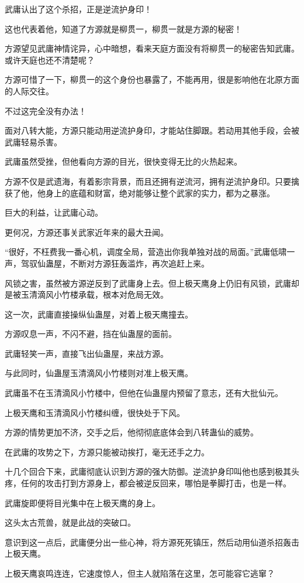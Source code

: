 \begin{this_body}
武庸认出了这个杀招，正是逆流护身印！

这也代表着他，知道了方源就是柳贯一，柳贯一就是方源的秘密！

方源望见武庸神情诧异，心中暗想，看来天庭方面没有将柳贯一的秘密告知武庸。或许天庭也还不清楚呢？

方源可惜了一下，柳贯一的这个身份也暴露了，不能再用，很是影响他在北原方面的人际交往。

不过这完全没有办法！

面对八转大能，方源只能动用逆流护身印，才能站住脚跟。若动用其他手段，会被武庸轻易杀害。

武庸虽然受挫，但他看向方源的目光，很快变得无比的火热起来。

方源不仅是武遗海，有着影宗背景，而且还拥有逆流河，拥有逆流护身印。只要擒获了他，他身上的底蕴和财富，绝对能够让整个武家的实力，都为之暴涨。

巨大的利益，让武庸心动。

更何况，方源还事关武家近年来的最大丑闻。

“很好，不枉费我一番心机，调度全局，营造出你我单独对战的局面。”武庸低啸一声，驾驭仙蛊屋，不断对方源狂轰滥炸，再次追赶上来。

风锁之害，虽然被方源逆反到了武庸身上去。但上极天鹰身上仍旧有风锁，武庸却是被玉清滴风小竹楼承载，根本对危局无效。

这一次，武庸直接操纵仙蛊屋，对着上极天鹰撞去。

方源叹息一声，不闪不避，挡在仙蛊屋的面前。

武庸轻笑一声，直接飞出仙蛊屋，来战方源。

与此同时，仙蛊屋玉清滴风小竹楼则对准上极天鹰。

武庸虽不在玉清滴风小竹楼中，但他在仙蛊屋内预留了意志，还有大批仙元。

上极天鹰和玉清滴风小竹楼纠缠，很快处于下风。

方源的情势更加不济，交手之后，他彻彻底底体会到八转蛊仙的威势。

在武庸的攻势之下，方源只能被动挨打，毫无还手之力。

十几个回合下来，武庸彻底认识到方源的强大防御。逆流护身印叫他也感到极其头疼，任何的攻击打到方源身上，都会被逆反回来，哪怕是拳脚打击，也是一样。

武庸旋即便将目光集中在上极天鹰的身上。

这头太古荒兽，就是此战的突破口。

意识到这一点后，武庸便分出一些心神，将方源死死镇压，然后动用仙道杀招轰击上极天鹰。

上极天鹰哀鸣连连，它速度惊人，但主人就陷落在这里，怎可能容它逃窜？


\end{this_body}
